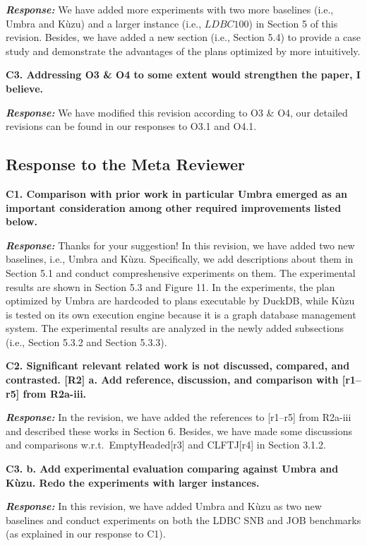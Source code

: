 \textbf{\textit{Response: }}
We have added more experiments with two more baselines (i.e., Umbra and K\`uzu) and a larger instance (i.e., $LDBC100$) in Section 5 of this revision.
Besides, we have added a new section (i.e., Section 5.4) to provide a case study and  demonstrate the advantages of the plans optimized by \name more intuitively.


\textbf{
C3. Addressing O3 \& O4 to some extent would strengthen the paper, I believe.}

\textbf{\textit{Response: }}
We have modified this revision according to O3 \& O4, our detailed revisions can be found in our responses to O3.1 and O4.1.



\subsection{Response to the Meta Reviewer}

\textbf{
C1. Comparison with prior work in particular Umbra emerged as an important consideration among other required improvements listed below.}

\textbf{\textit{Response: }}
Thanks for your suggestion!
In this revision, we have added two new baselines, i.e., Umbra and K\`uzu.
Specifically, we add descriptions about them in Section 5.1 and conduct compreshensive experiments on them.
The experimental results are shown in Section 5.3 and Figure 11.
In the experiments, the plan optimized by Umbra are hardcoded to plans executable by DuckDB, while K\`uzu is tested on its own execution engine because it is a graph database management system.
The experimental results are analyzed in the newly added subsections (i.e., Section 5.3.2 and Section 5.3.3).



\textbf{
C2. Significant relevant related work is not discussed, compared, and contrasted. [R2]
a. Add reference, discussion, and comparison with [r1–r5] from R2a-iii.
}

\textbf{\textit{Response: }}
In the revision, we have added the references to [r1--r5] from R2a-iii and described these works in Section 6.
Besides, we have made some discussions and comparisons w.r.t.~EmptyHeaded[r3] and CLFTJ[r4] in Section 3.1.2.


\textbf{C3. b. Add experimental evaluation comparing against Umbra and Kùzu. Redo the experiments with larger instances.}

\textbf{\textit{Response: }}
In this revision, we have added Umbra and K\`uzu as two new baselines and conduct experiments on both the LDBC SNB and JOB benchmarks (as explained in our response to C1).


